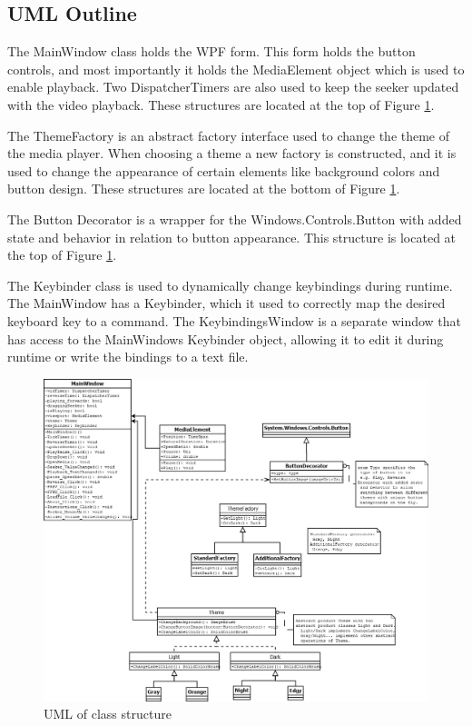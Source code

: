 \documentclass[10pt,conference,onecolumn,compsoc]{IEEEtran}
\begin{document}
\subsection{UML Outline}

The MainWindow class holds the WPF form. This form holds the button controls, and most importantly it holds the MediaElement object which is used to enable playback. Two DispatcherTimers are also used to keep the seeker updated with the video playback. These structures are located at the top of Figure \ref{MainUML}.\par
The ThemeFactory is an abstract factory interface used to change the theme of the media player. When choosing a theme a new factory is constructed, and it is used to change the appearance of certain elements like background colors and button design. These structures are located at the bottom of Figure \ref{MainUML}.\par
The Button Decorator is a wrapper for the Windows.Controls.Button with added state and behavior in relation to button appearance. This structure is located at the top of Figure \ref{MainUML}.\par
The Keybinder class is used to dynamically change keybindings during runtime. The MainWindow has a Keybinder, which it used to correctly map the desired keyboard key to a command. The KeybindingsWindow is a separate window that has access to the MainWindows Keybinder object, allowing it to edit it during runtime or write the bindings to a text file.

\begin{figure}[H]
\begin{center}
\includegraphics[scale=0.4]{MediaPlayerUML.png}
\caption{UML of class structure}
\label{MainUML}
\end{center}
\end{figure}
\end{document}
